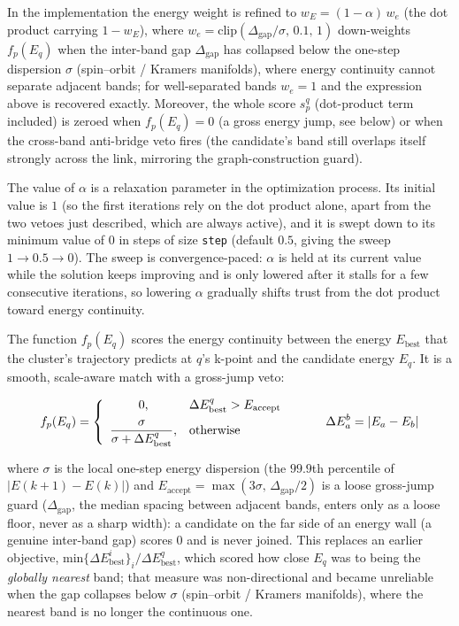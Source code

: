 \documentclass[a4paper,12pt]{report}
\begin{document}
\begin{appendices}
In the implementation the energy weight is refined to $w_E = (1-\alpha)\,w_e$ (the dot product carrying $1-w_E$), where $w_e = \mathrm{clip}(\Delta_\text{gap}/\sigma,\, 0.1,\, 1)$ down-weights $f_p(E_q)$ when the inter-band gap $\Delta_\text{gap}$ has collapsed below the one-step dispersion $\sigma$ (spin--orbit / Kramers manifolds), where energy continuity cannot separate adjacent bands; for well-separated bands $w_e=1$ and the expression above is recovered exactly.
Moreover, the whole score $s_p^q$ (dot-product term included) is zeroed when $f_p(E_q)=0$ (a gross energy jump, see below) or when the cross-band anti-bridge veto fires (the candidate's band still overlaps itself strongly across the link, mirroring the graph-construction guard).

The value of $\alpha$ is a relaxation parameter in the optimization process.
Its initial value is $1$ (so the first iterations rely on the dot product alone, apart from the two vetoes just described, which are always active), and it is swept down to its minimum value of $0$ in steps of size \texttt{step} (default $0.5$, giving the sweep $1 \to 0.5 \to 0$).
The sweep is convergence-paced: $\alpha$ is held at its current value while the solution keeps improving and is only lowered after it stalls for a few consecutive iterations, so lowering $\alpha$ gradually shifts trust from the dot product toward energy continuity.

The function $f_p(E_q)$ scores the energy continuity between the energy $E_\text{best}$ that the cluster's trajectory predicts at $q$'s k-point and the candidate energy $E_q$. It is a smooth, scale-aware match with a gross-jump veto:

\begin{equation}
    f_p(E_q) = \left\{
    \begin{array}{cl}
        0, & \Delta E_\text{best}^q > E_\text{accept} \\[0.2cm]
        \dfrac{\sigma}{\sigma + \Delta E_\text{best}^q}, & \text{otherwise}
    \end{array}
    \right.
    \hspace{1.0cm} \Delta E_a^b = |E_a-E_b|
\end{equation}

where $\sigma$ is the local one-step energy dispersion (the $99.9$th percentile of $|E(k+1)-E(k)|$) and $E_\text{accept} = \max(3\sigma,\, \Delta_\text{gap}/2)$ is a loose gross-jump guard ($\Delta_\text{gap}$, the median spacing between adjacent bands, enters only as a loose floor, never as a sharp width): a candidate on the far side of an energy wall (a genuine inter-band gap) scores $0$ and is never joined.
This replaces an earlier objective, $\text{min}\{\Delta E_\text{best}^{i}\}_i / \Delta E_\text{best}^q$, which scored how close $E_q$ was to being the \emph{globally nearest} band; that measure was non-directional and became unreliable when the gap collapses below $\sigma$ (spin--orbit / Kramers manifolds), where the nearest band is no longer the continuous one.


\end{appendices}
\end{document}
